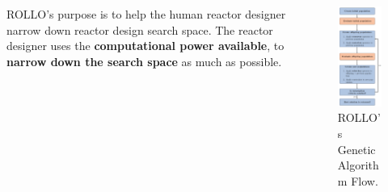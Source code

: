\begin{frame}
\begin{columns}
\begin{column}{0.7\textwidth}
            \vspace{0.2cm}
            ROLLO's purpose is to help the human reactor designer narrow down reactor design 
            search space. The reactor designer uses the \textbf{computational power 
            available}, to \textbf{narrow down the search space} as much as possible.
        \end{column}
        \begin{column}{0.3\textwidth}
            \begin{figure}
                \includegraphics[width=0.8\linewidth]{figures/rollo-flow2.png} 
                \caption{ROLLO's Genetic Algorithm Flow.}
            \end{figure}
        \end{column}
    \end{columns}
\end{frame}

